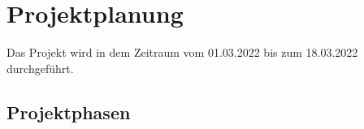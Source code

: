 \section{Projektplanung}
\label{projektplanung}
Das Projekt wird in dem Zeitraum vom 01.03.2022 bis zum 18.03.2022 durchgeführt. %

\subsection{Projektphasen}
\label{projektphasen}
\begin{comment}
todo Lesbarkeit Tabelle: ich schlage vor, nur die Zusammenfassung bzw Summen  jeweils in einer anderen Farbe zu gestalten, so wäre es übersichtlicher, jetzt muss ich erst überlegen und rechnen ob die Summen mit den nächsten Zeilen passen
Realisierung: 30 zb blau als Summe
Frontend 13 zb hellblau als Teilsumme
Knöpfe eingebunden & Styling 3 zb grau oder weiß als Summand
Funktionalität Backend Anbindung, abhängiges Rendering 7
Eventhandling, Texte mit Internationalisierung 2
Entwicklung Oberfläche
\end{comment}


